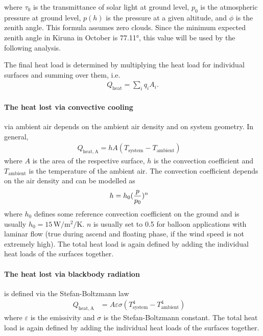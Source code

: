 \documentclass[
  a4paper,
  11pt,
  openany,
  parskip,
  toc=totoc,
  listof=totoc,
  bibliography=totoc
]{scrreprt}
\let\qty\relax
\newcommand{\qty}[1]{\left( #1 \right)}
\newcommand{\qc}{\quad}
\begin{document}
where $\tau_0$ is the transmittance of solar light at ground level, $p_0$ is the atmospheric pressure at ground level, $p(h)$ is the pressure at a given altitude, and $\phi$ is the zenith angle. This formula assumes zero clouds. Since the minimum expected zenith angle in Kiruna in October is 77.11°, this value will be used by the following analysis.\par 
The final heat load is determined by multiplying the heat load for individual surfaces and summing over them, i.e.
\begin{align}
    Q_\mathrm{heat}=\sum_i q_i A_i.
\end{align}

\paragraph{The heat lost via convective cooling} via ambient air depends on the ambient air density and on system geometry. In general, 
\begin{align}
    Q_\mathrm{heat,A} = hA(T_\mathrm{system}-T_\mathrm{ambient})\qc
\end{align}
where $A$ is the area of the respective surface, $h$ is the convection coefficient and $T_\mathrm{ambient}$ is the temperature of the ambient air. The convection coefficient depends on the air density and can be modelled as 
\begin{align}
    h = h_0 \qty(\frac{p}{p_0})^n\qc
\end{align}
where $h_0$ defines some reference convection coefficient on the ground and is usually $h_0=15\,\mathrm{W/m^2/K}$. 
$n$ is usually set to 0.5 for balloon applications with laminar flow (true during ascend and floating phase, if the wind speed is not extremely high). The total heat load is again defined by adding the individual heat loads of the surfaces together.

\paragraph{The heat lost via blackbody radiation} is defined via the Stefan-Boltzmann law 
\begin{align}
    Q_\mathrm{heat,A}&= A\varepsilon\sigma (T_\mathrm{system}^4-T_\mathrm{ambient}^4)\qc
\end{align}
where $\varepsilon$ is the emissivity and $\sigma$ is the Stefan-Boltzmann constant. The total heat load is again defined by adding the individual heat loads of the surfaces together.
\end{document}
